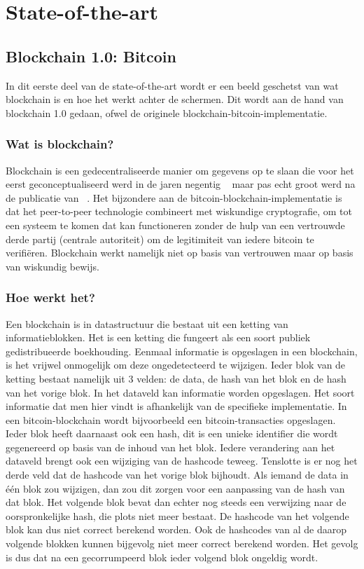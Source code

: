 
\section{State-of-the-art}
\label{sec:state-of-the-art}

\subsection*{Blockchain 1.0: Bitcoin}
In dit eerste deel van de state-of-the-art wordt er een beeld geschetst van wat blockchain is en hoe het werkt achter de schermen. Dit wordt aan de hand van blockchain 1.0 gedaan, ofwel de originele blockchain-bitcoin-implementatie.
\subsubsection*{Wat is blockchain?}
 Blockchain is een gedecentraliseerde manier om gegevens op te slaan die voor het eerst geconceptualiseerd werd in de jaren negentig  ~\autocite{Dai1998} maar pas echt groot werd na de publicatie van ~\textcite{Nakamoto2008}. Het bijzondere aan de bitcoin-blockchain-implementatie is dat het peer-to-peer technologie combineert met wiskundige cryptografie, om tot een systeem te komen dat kan functioneren zonder de hulp van een vertrouwde derde partij  (centrale autoriteit) om de legitimiteit van iedere bitcoin te verifiëren. Blockchain werkt namelijk niet op basis van vertrouwen maar op basis van wiskundig bewijs.
 
 \subsubsection*{Hoe werkt het?}
Een blockchain is in datastructuur die bestaat uit een ketting van informatieblokken. Het is een ketting die fungeert als een soort publiek gedistribueerde boekhouding. Eenmaal informatie is opgeslagen in een blockchain, is het vrijwel onmogelijk om deze ongedetecteerd te wijzigen. Ieder blok van de ketting bestaat namelijk uit 3 velden: de data, de hash van het blok en de hash van het vorige blok. In het dataveld kan informatie worden opgeslagen. Het soort informatie dat men hier vindt is afhankelijk van de specifieke implementatie. In een bitcoin-blockchain wordt bijvoorbeeld een bitcoin-transacties opgeslagen. Ieder blok heeft daarnaast ook een hash, dit is een unieke identifier die wordt gegenereerd op basis van de inhoud van het blok. Iedere verandering aan het dataveld brengt ook een wijziging van de hashcode teweeg. Tenslotte is er nog het derde veld dat de hashcode van het vorige blok bijhoudt. Als iemand de data in één blok zou wijzigen, dan zou dit zorgen voor een aanpassing van de hash van dat blok. Het volgende blok bevat dan echter nog steeds een verwijzing naar de oorspronkelijke hash, die plots niet meer bestaat. De hashcode van het volgende blok kan dus niet  correct berekend worden. Ook de hashcodes van al de daarop volgende blokken kunnen bijgevolg niet meer correct berekend worden. Het gevolg is dus dat na een gecorrumpeerd blok ieder volgend blok ongeldig wordt. 

